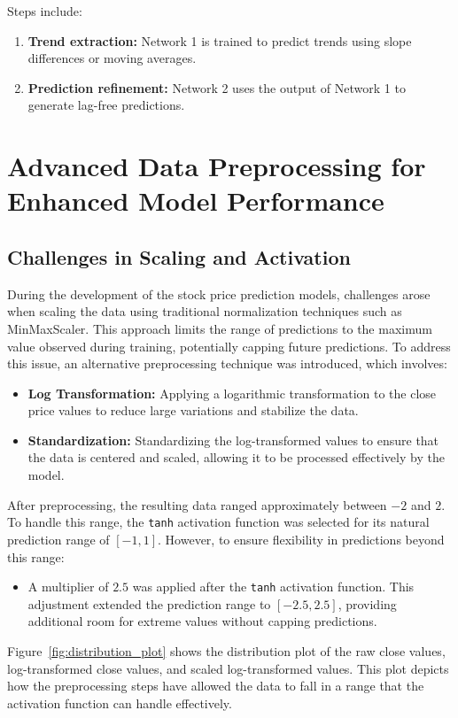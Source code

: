 Steps include:
\begin{enumerate}
    \item \textbf{Trend extraction:} Network 1 is trained to predict trends using slope differences or moving averages.
    \item \textbf{Prediction refinement:} Network 2 uses the output of Network 1 to generate lag-free predictions.
\end{enumerate}

\section{Advanced Data Preprocessing for Enhanced Model Performance}
\subsection{Challenges in Scaling and Activation}
During the development of the stock price prediction models, challenges arose when scaling the data using traditional normalization techniques such as MinMaxScaler. This approach limits the range of predictions to the maximum value observed during training, potentially capping future predictions. To address this issue, an alternative preprocessing technique was introduced, which involves:
\begin{itemize}
    \item \textbf{Log Transformation:} Applying a logarithmic transformation to the close price values to reduce large variations and stabilize the data.
    \item \textbf{Standardization:} Standardizing the log-transformed values to ensure that the data is centered and scaled, allowing it to be processed effectively by the model.
\end{itemize}

After preprocessing, the resulting data ranged approximately between $-2$ and $2$. To handle this range, the \texttt{tanh} activation function was selected for its natural prediction range of $[-1, 1]$. However, to ensure flexibility in predictions beyond this range:
\begin{itemize}
    \item A multiplier of $2.5$ was applied after the \texttt{tanh} activation function. This adjustment extended the prediction range to $[-2.5, 2.5]$, providing additional room for extreme values without capping predictions.
\end{itemize}

Figure~\ref{fig:distribution_plot} shows the distribution plot of the raw close values, log-transformed close values, and scaled log-transformed values. This plot depicts how the preprocessing steps have allowed the data to fall in a range that the activation function can handle effectively.

